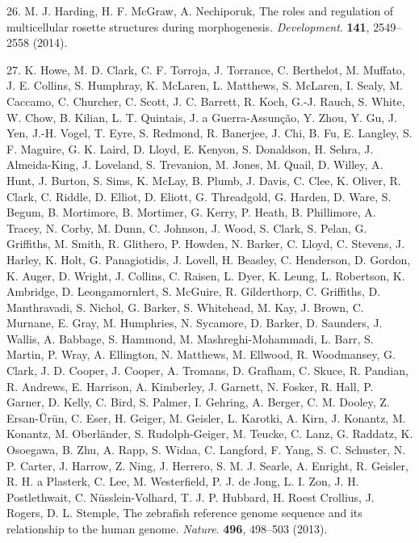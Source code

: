 \documentclass[11pt,singlespacinge,twoside]{reedthesis} %
\theoremstyle{definition}
\theoremstyle{definition}
\theoremstyle{definition}
\theoremstyle{remark}
\begin{document}
\leavevmode\hypertarget{ref-Harding2014b}{}%
26. M. J. Harding, H. F. McGraw, A. Nechiporuk, The roles and regulation of multicellular rosette structures during morphogenesis. \emph{Development}. \textbf{141}, 2549--2558 (2014).

\leavevmode\hypertarget{ref-Howe2013a}{}%
27. K. Howe, M. D. Clark, C. F. Torroja, J. Torrance, C. Berthelot, M. Muffato, J. E. Collins, S. Humphray, K. McLaren, L. Matthews, S. McLaren, I. Sealy, M. Caccamo, C. Churcher, C. Scott, J. C. Barrett, R. Koch, G.-J. Rauch, S. White, W. Chow, B. Kilian, L. T. Quintais, J. a Guerra-Assunção, Y. Zhou, Y. Gu, J. Yen, J.-H. Vogel, T. Eyre, S. Redmond, R. Banerjee, J. Chi, B. Fu, E. Langley, S. F. Maguire, G. K. Laird, D. Lloyd, E. Kenyon, S. Donaldson, H. Sehra, J. Almeida-King, J. Loveland, S. Trevanion, M. Jones, M. Quail, D. Willey, A. Hunt, J. Burton, S. Sims, K. McLay, B. Plumb, J. Davis, C. Clee, K. Oliver, R. Clark, C. Riddle, D. Elliot, D. Eliott, G. Threadgold, G. Harden, D. Ware, S. Begum, B. Mortimore, B. Mortimer, G. Kerry, P. Heath, B. Phillimore, A. Tracey, N. Corby, M. Dunn, C. Johnson, J. Wood, S. Clark, S. Pelan, G. Griffiths, M. Smith, R. Glithero, P. Howden, N. Barker, C. Lloyd, C. Stevens, J. Harley, K. Holt, G. Panagiotidis, J. Lovell, H. Beasley, C. Henderson, D. Gordon, K. Auger, D. Wright, J. Collins, C. Raisen, L. Dyer, K. Leung, L. Robertson, K. Ambridge, D. Leongamornlert, S. McGuire, R. Gilderthorp, C. Griffiths, D. Manthravadi, S. Nichol, G. Barker, S. Whitehead, M. Kay, J. Brown, C. Murnane, E. Gray, M. Humphries, N. Sycamore, D. Barker, D. Saunders, J. Wallis, A. Babbage, S. Hammond, M. Mashreghi-Mohammadi, L. Barr, S. Martin, P. Wray, A. Ellington, N. Matthews, M. Ellwood, R. Woodmansey, G. Clark, J. D. Cooper, J. Cooper, A. Tromans, D. Grafham, C. Skuce, R. Pandian, R. Andrews, E. Harrison, A. Kimberley, J. Garnett, N. Fosker, R. Hall, P. Garner, D. Kelly, C. Bird, S. Palmer, I. Gehring, A. Berger, C. M. Dooley, Z. Ersan-Ürün, C. Eser, H. Geiger, M. Geisler, L. Karotki, A. Kirn, J. Konantz, M. Konantz, M. Oberländer, S. Rudolph-Geiger, M. Teucke, C. Lanz, G. Raddatz, K. Osoegawa, B. Zhu, A. Rapp, S. Widaa, C. Langford, F. Yang, S. C. Schuster, N. P. Carter, J. Harrow, Z. Ning, J. Herrero, S. M. J. Searle, A. Enright, R. Geisler, R. H. a Plasterk, C. Lee, M. Westerfield, P. J. de Jong, L. I. Zon, J. H. Postlethwait, C. Nüsslein-Volhard, T. J. P. Hubbard, H. Roest Crollius, J. Rogers, D. L. Stemple, The zebrafish reference genome sequence and its relationship to the human genome. \emph{Nature}. \textbf{496}, 498--503 (2013).
\end{document}
